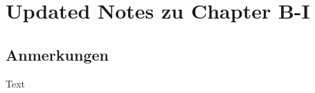 \chapter{Updated Notes zu Chapter B-I}
\section*{Anmerkungen}
Text \citet{engelnagel:2006}

\RaggedRight


